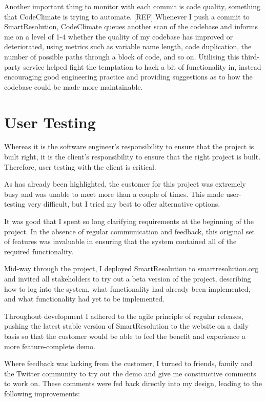 Another important thing to monitor with each commit is code quality, something that CodeClimate is trying to automate. [REF] Whenever I push a commit to SmartResolution, CodeClimate queues another scan of the codebase and informs me on a level of 1-4 whether the quality of my codebase has improved or deteriorated, using metrics such as variable name length, code duplication, the number of possible paths through a block of code, and so on. Utilising this third-party service helped fight the temptation to hack a bit of functionality in, instead encouraging good engineering practice and providing suggestions as to how the codebase could be made more maintainable. %

\section{User Testing}

Whereas it is the software engineer's responsibility to ensure that the project is built right, it is the client's responsibility to ensure that the right project is built. Therefore, user testing with the client is critical.

As has already been highlighted, the customer for this project was extremely busy and was unable to meet more than a couple of times. This made user-testing very difficult, but I tried my best to offer alternative options.

It was good that I spent so long clarifying requirements at the beginning of the project. In the absence of regular communication and feedback, this original set of features was invaluable in ensuring that the system contained all of the required functionality.

Mid-way through the project, I deployed SmartResolution to smartresolution.org and invited all stakeholders to try out a beta version of the project, describing how to log into the system, what functionality had already been implemented, and what functionality had yet to be implemented.

Throughout development I adhered to the agile principle of regular releases, pushing the latest stable version of SmartResolution to the website on a daily basis so that the customer would be able to feel the benefit and experience a more feature-complete demo.

Where feedback was lacking from the customer, I turned to friends, family and the Twitter community to try out the demo and give me constructive comments to work on. These comments were fed back directly into my design, leading to the following improvements:

